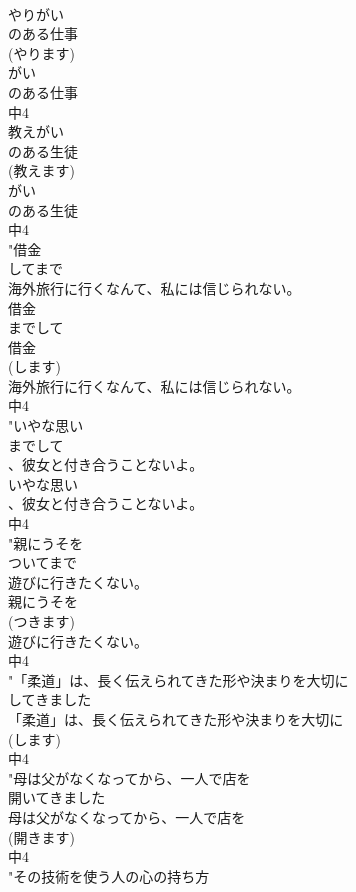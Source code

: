 \documentclass[8pt]{extreport}
\begin{document}
\begin{CJK}{UTF8}{min}
\\	やりがい
\\	のある仕事
\\	(やります)
\\	がい
\\	のある仕事
\\	中4
\\	教えがい
\\	のある生徒
\\	(教えます)
\\	がい
\\	のある生徒
\\	中4
\\	"借金
\\	してまで
\\	海外旅行に行くなんて、私には信じられない。
\\	借金
\\	までして
\\	借金
\\	(します)
\\	海外旅行に行くなんて、私には信じられない。
\\	中4
\\	"いやな思い
\\	までして
\\	、彼女と付き合うことないよ。
\\	いやな思い
\\	、彼女と付き合うことないよ。
\\	中4
\\	"親にうそを
\\	ついてまで
\\	遊びに行きたくない。
\\	親にうそを
\\	(つきます)
\\	遊びに行きたくない。
\\	中4
\\	"「柔道」は、長く伝えられてきた形や決まりを大切に
\\	してきました
\\	「柔道」は、長く伝えられてきた形や決まりを大切に
\\	(します)
\\	中4
\\	"母は父がなくなってから、一人で店を
\\	開いてきました
\\	母は父がなくなってから、一人で店を
\\	(開きます)
\\	中4
\\	"その技術を使う人の心の持ち方

\end{CJK}
\end{document}
